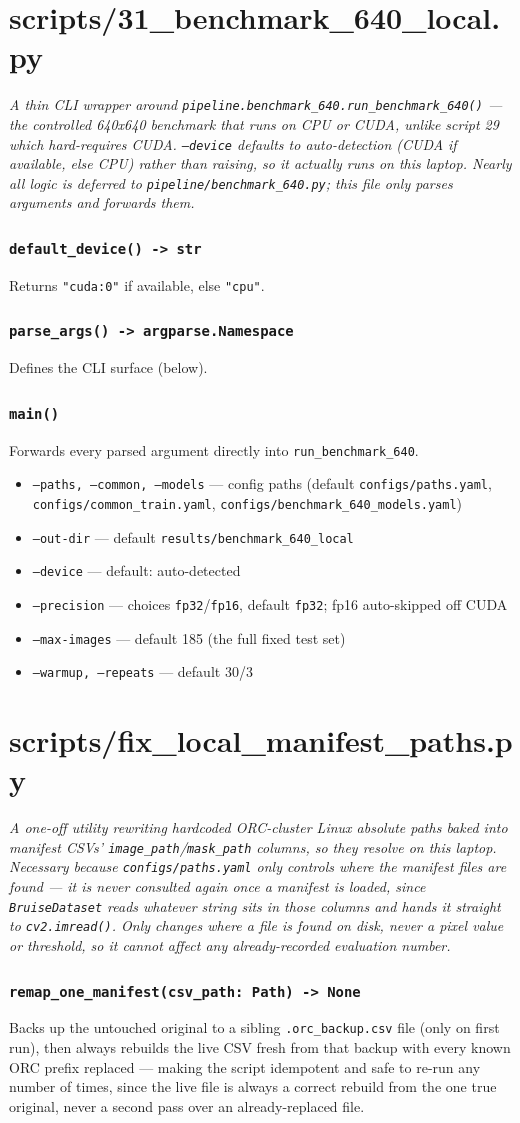 \documentclass[11pt]{article}
\newcommand{\role}[1]{\par\noindent\textit{#1}\par\vspace{0.5em}}
\newcommand{\func}[1]{\subsubsection*{\texttt{#1}}}
\newcommand{\cliarg}[2]{\item \texttt{#1} --- #2}
\begin{document}
\section{scripts/31\_benchmark\_640\_local.py}
\role{A thin CLI wrapper around \texttt{pipeline.benchmark\_640.run\_benchmark\_640()}
--- the controlled 640x640 benchmark that runs on CPU or CUDA, unlike script 29
which hard-requires CUDA. \texttt{--device} defaults to auto-detection (CUDA if
available, else CPU) rather than raising, so it actually runs on this laptop.
Nearly all logic is deferred to \texttt{pipeline/benchmark\_640.py}; this file
only parses arguments and forwards them.}

\func{default\_device() -> str}
Returns \texttt{"cuda:0"} if available, else \texttt{"cpu"}.

\func{parse\_args() -> argparse.Namespace}
Defines the CLI surface (below).

\func{main()}
Forwards every parsed argument directly into \texttt{run\_benchmark\_640}.

\begin{itemize}[nosep]
\cliarg{--paths, --common, --models}{config paths (default \texttt{configs/paths.yaml}, \texttt{configs/common\_train.yaml}, \texttt{configs/benchmark\_640\_models.yaml})}
\cliarg{--out-dir}{default \texttt{results/benchmark\_640\_local}}
\cliarg{--device}{default: auto-detected}
\cliarg{--precision}{choices \texttt{fp32}/\texttt{fp16}, default \texttt{fp32}; fp16 auto-skipped off CUDA}
\cliarg{--max-images}{default 185 (the full fixed test set)}
\cliarg{--warmup, --repeats}{default 30/3}
\end{itemize}

\section{scripts/fix\_local\_manifest\_paths.py}
\role{A one-off utility rewriting hardcoded ORC-cluster Linux absolute paths
baked into manifest CSVs' \texttt{image\_path}/\texttt{mask\_path} columns, so
they resolve on this laptop. Necessary because \texttt{configs/paths.yaml} only
controls where the manifest \emph{files} are found --- it is never consulted
again once a manifest is loaded, since \texttt{BruiseDataset} reads whatever
string sits in those columns and hands it straight to \texttt{cv2.imread()}.
Only changes where a file is found on disk, never a pixel value or threshold,
so it cannot affect any already-recorded evaluation number.}

\func{remap\_one\_manifest(csv\_path: Path) -> None}
Backs up the untouched original to a sibling \texttt{.orc\_backup.csv} file (only
on first run), then always rebuilds the live CSV fresh from that backup with
every known ORC prefix replaced --- making the script idempotent and safe to
re-run any number of times, since the live file is always a correct rebuild
from the one true original, never a second pass over an already-replaced file.
\end{document}
